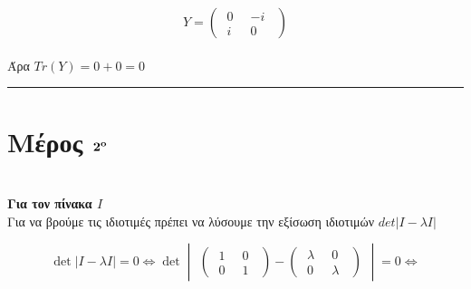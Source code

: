 \documentclass[12pt]{article}
\begin{document}
\section*{{}}

$$Y=\begin{pmatrix}
    \;0 \;\; & -i \;\;\\ \;i \;\; & 0 \;\;
\end{pmatrix} $$\\
Άρα $Tr(Y)=0+0 = 0$\\
\rule{\textwidth}{.5pt}
\section*{{\bf Μέρος  $\bf 2^o$ }}



\section*{{}}
{\bf Για τον πίνακα $Ι$}\\
Για να βρούμε τις ιδιοτιμές πρέπει να λύσουμε την εξίσωση ιδιοτιμών $det|Ι-\lambda I|$

$$ \det |Ι-\lambda I| = 0 \Leftrightarrow \det \begin{vmatrix}\begin{pmatrix}\;1 \;\; & 0 \;\;\\ \;0 \;\; & 1 \;\;\end{pmatrix} -\begin{pmatrix}\;\lambda \;\; & 0 \;\;\\\;0 \;\; & \lambda \;\;\end{pmatrix}\end{vmatrix}  =0 \Leftrightarrow$$
\end{document}
